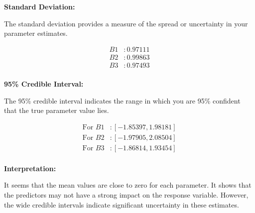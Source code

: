 \documentclass{article}
\begin{document}
\textbf{Standard Deviation:}

The standard deviation provides a measure of the spread or uncertainty in your parameter estimates.

\[
\begin{align*}
B1 & : 0.97111 \\
B2 & : 0.99863 \\
B3 & : 0.97493 \\
\end{align*}
\]

\textbf{95\% Credible Interval:}

The 95\% credible interval indicates the range in which you are 95\% confident that the true parameter value lies.

\[
\begin{align*}
\text{For } B1 & : [-1.85397, 1.98181] \\
\text{For } B2 & : [-1.97905, 2.08504] \\
\text{For } B3 & : [-1.86814, 1.93454] \\
\end{align*}
\]

\textbf{Interpretation:}

It seems that the mean values are close to zero for each parameter. It shows that the predictors may not have a strong impact on the response variable. However, the wide credible intervals indicate significant uncertainty in these estimates.
\end{document}
